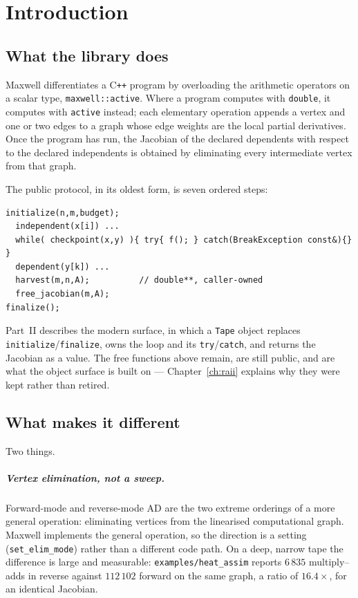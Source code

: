 \documentclass[11pt,a4paper]{report}
\newcommand{\code}[1]{\texttt{#1}}
\begin{document}
\chapter{Introduction}

\section{What the library does}

Maxwell differentiates a C\texttt{++} program by overloading the arithmetic
operators on a scalar type, \code{maxwell::active}. Where a program computes
with \code{double}, it computes with \code{active} instead; each elementary
operation appends a vertex and one or two edges to a graph whose edge weights
are the local partial derivatives. Once the program has run, the Jacobian of
the declared dependents with respect to the declared independents is obtained
by eliminating every intermediate vertex from that graph.

The public protocol, in its oldest form, is seven ordered steps:

\begin{lstlisting}
initialize(n,m,budget);
  independent(x[i]) ...
  while( checkpoint(x,y) ){ try{ f(); } catch(BreakException const&){} }
  dependent(y[k]) ...
  harvest(m,n,A);          // double**, caller-owned
  free_jacobian(m,A);
finalize();
\end{lstlisting}

\noindent
Part~II describes the modern surface, in which a \code{Tape} object replaces
\code{initialize}/\code{finalize}, owns the loop and its \code{try}/\code{catch},
and returns the Jacobian as a value. The free functions above remain, are still
public, and are what the object surface is built on --- Chapter~\ref{ch:raii}
explains why they were kept rather than retired.

\section{What makes it different}

Two things.

\paragraph{Vertex elimination, not a sweep.} Forward-mode and reverse-mode AD
are the two extreme orderings of a more general operation: eliminating vertices
from the linearised computational graph. Maxwell implements the general
operation, so the direction is a setting (\code{set\_elim\_mode}) rather than a
different code path. On a deep, narrow tape the difference is large and
measurable: \code{examples/heat\_assim} reports $6\,835$ multiply--adds in
reverse against $112\,102$ forward on the same graph, a ratio of $16.4\times$,
for an identical Jacobian.
\end{document}
